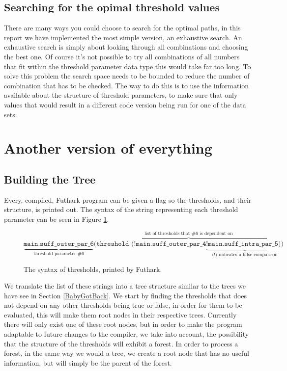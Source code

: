 \subsection{Searching for the opimal threshold values}
There are many ways you could choose to search for the optimal paths, in this
report we have implemented the most simple version, an exhaustive search. An
exhaustive search is simply about looking through all combinations and choosing
the best one. Of course it's not possible to try all combinations of all numbers
that fit within the threshold parameter data type this would take far too long. 
To solve this problem the search space needs to be bounded to reduce the number
of combination that has to be checked. The way to do this is to use the
information available about the structure of threshold parameters, to make sure
that only values that would result in a different code version being run for 
one of the data sets. 

\section{Another version of everything}
\subsection{Building the Tree}
Every, compiled, Futhark program can be given a flag so the thresholds, and their structure, is printed out. The syntax of the string representing each threshold parameter
can be seen in Figure \ref{thresholdSyntax}.
\begin{figure}[h]
	$$\underbrace{\texttt{main.suff\_outer\_par\_6}}_\text{threshold parameter \#6} \overbrace{\texttt{(threshold (!main.suff\_outer\_par\_4} \underbrace{\texttt{!main.suff\_intra\_par\_5))}}_\text{(!) indicates a false comparison}}^\text{list of thresholds that \#6 is dependent on}$$
	\caption{The syntax of thresholds, printed by Futhark.}
	\label{thresholdSyntax}
\end{figure}
We translate the list of these strings into a tree structure similar to the
trees we have see in Section \ref{BabyGotBack}. 
We start by finding the thresholds that does not depend on any other thresholds
being true or false, in order for them to be evaluated, this will make them root nodes in their respective trees. Currently there will only exist one of these root nodes, but in order to make the program
adaptable to future changes to the compiler, we take into account, the possibility that the
structure of the thresholds will exhibit a forest. In order to process a forest, in the same way we would a tree, 
we create a root node that has no useful information, but will simply be the
parent of the forest. \\


